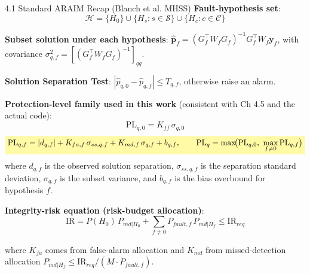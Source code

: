 \documentclass[10pt,aspectratio=169,xcolor=dvipsnames]{beamer}
\newcommand{\PL}{\mathrm{PL}}
\newcommand{\IR}{\mathrm{IR}}
\newcommand{\1}{\mathbb{1}}
\newcommand{\Hset}{\mathcal{H}}
\newcommand{\hlb}[1]{\colorbox{yellow!35}{\(\displaystyle #1\)}}
\begin{document}
\begin{frame}{4.1 Standard ARAIM Recap (Blanch et al. MHSS)}
  \small
  \textbf{Fault-hypothesis set}:
  \[
    \Hset = \{H_0\} \cup \{H_s : s \in \mathcal{S}\} \cup \{H_c : c \in \mathcal{C}\}
  \]

  \textbf{Subset solution under each hypothesis}: $\hat{\bm{p}}_f = (G_f^\top W_f G_f)^{-1} G_f^\top W_f \bm{y}_f$, with covariance $\sigma_{q,f}^2 = [(G_f^\top W_f G_f)^{-1}]_{qq}$.

  \textbf{Solution Separation Test}: $|\hat{p}_{q,0} - \hat{p}_{q,f}| \le T_{q,f}$, otherwise raise an alarm.

  \medskip
  \textbf{Protection-level family used in this work} (consistent with Ch 4.5 and the actual code):
  \[
    \PL_{q,0} = K_{ff}\,\sigma_{q,0}
  \]
  \[
    \hlb{
      \PL_{q,f} = |d_{q,f}| + K_{fa,f}\,\sigma_{ss,q,f} + K_{md,f}\,\sigma_{q,f} + b_{q,f},
      \qquad
      \PL_q = \max\!\bigl(\PL_{q,0},\ \max_{f\ne 0}\PL_{q,f}\bigr)
    }
  \]
  where $d_{q,f}$ is the observed solution separation, $\sigma_{ss,q,f}$ is the separation standard deviation, $\sigma_{q,f}$ is the subset variance, and $b_{q,f}$ is the bias overbound for hypothesis $f$.

  \medskip
  \textbf{Integrity-risk equation (risk-budget allocation)}:
  \[
    \IR = P(H_0)\,P_{md|H_0} + \sum_{f\ne 0} P_{fault,f}\,P_{md|H_f} \le \IR_{req}
  \]

  \footnotesize
  where \(K_{fa}\) comes from false-alarm allocation and \(K_{md}\) from missed-detection allocation $P_{md|H_f}\le \IR_{req}/(M\cdot P_{fault,f})$.
\end{frame}
\end{document}
